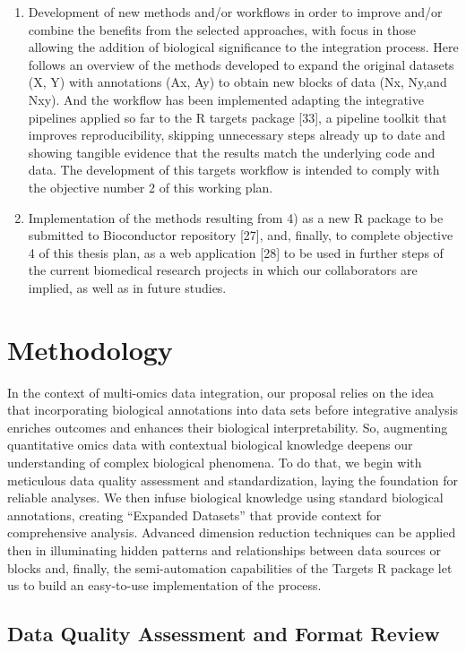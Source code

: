 \documentclass[a4paper, nobind]{templates/ociamthesis}
\begin{document}
\begin{enumerate}
\item
  Development of new methods and/or workflows in order to improve and/or combine the benefits from the selected approaches, with focus in those allowing the addition of biological significance to the integration process. Here follows an overview of the methods developed to expand the original datasets (X, Y) with annotations (Ax, Ay) to obtain new blocks of data (Nx, Ny,and Nxy). And the workflow has been implemented adapting the integrative pipelines applied so far to the R targets package {[}33{]}, a pipeline toolkit that improves reproducibility, skipping unnecessary steps already up to date and showing tangible evidence that the results match the underlying code and data. The development of this targets workflow is intended to comply with the objective number 2 of this working plan.
\item
  Implementation of the methods resulting from 4) as a new R package to be submitted to Bioconductor repository {[}27{]}, and, finally, to complete objective 4 of this thesis plan, as a web application {[}28{]} to be used in further steps of the current biomedical research projects in which our collaborators are implied, as well as in future studies.
\end{enumerate}

\hypertarget{methodology}{%
\section{Methodology}\label{methodology}}

In the context of multi-omics data integration, our proposal relies on the idea that incorporating biological annotations into data sets before integrative analysis enriches outcomes and enhances their biological interpretability. So, augmenting quantitative omics data with contextual biological knowledge deepens our understanding of complex biological phenomena. To do that, we begin with meticulous data quality assessment and standardization, laying the foundation for reliable analyses. We then infuse biological knowledge using standard biological annotations, creating ``Expanded Datasets'' that provide context for comprehensive analysis. Advanced dimension reduction techniques can be applied then in illuminating hidden patterns and relationships between data sources or blocks and, finally, the semi-automation capabilities of the Targets R package let us to build an easy-to-use implementation of the process.

\hypertarget{data-quality-assessment-and-format-review}{%
\subsection{Data Quality Assessment and Format Review}\label{data-quality-assessment-and-format-review}}
\end{document}
